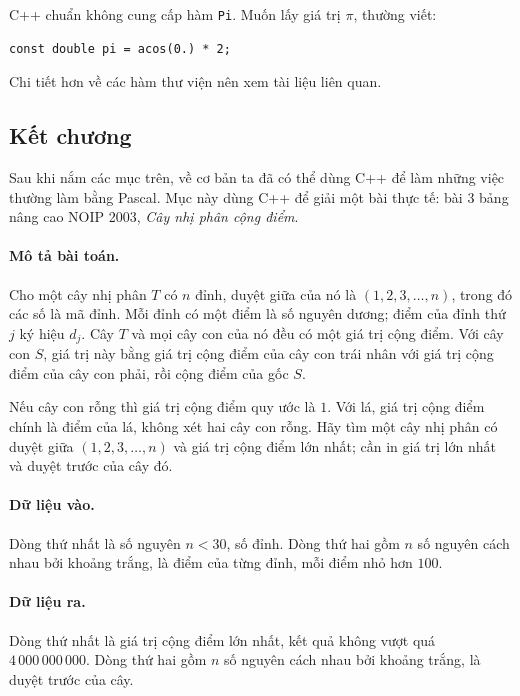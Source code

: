 \documentclass[11pt]{article}
\newcommand{\cpp}{C++}
\newcommand{\pascal}{Pascal}
\begin{document}
\cpp{} chuẩn không cung cấp hàm \verb|Pi|. Muốn lấy giá trị \(\pi\), thường
viết:

\begin{verbatim}
const double pi = acos(0.) * 2;
\end{verbatim}

Chi tiết hơn về các hàm thư viện nên xem tài liệu liên quan.

\subsection{Kết chương}

Sau khi nắm các mục trên, về cơ bản ta đã có thể dùng \cpp{} để làm những
việc thường làm bằng \pascal{}. Mục này dùng \cpp{} để giải một bài thực tế:
bài 3 bảng nâng cao NOIP 2003, \emph{Cây nhị phân cộng điểm}.

\paragraph{Mô tả bài toán.}
Cho một cây nhị phân \(T\) có \(n\) đỉnh, duyệt giữa của nó là
\((1,2,3,\ldots,n)\), trong đó các số là mã đỉnh. Mỗi đỉnh có một điểm là số
nguyên dương; điểm của đỉnh thứ \(j\) ký hiệu \(d_j\). Cây \(T\) và mọi cây
con của nó đều có một giá trị cộng điểm. Với cây con \(S\), giá trị này bằng
giá trị cộng điểm của cây con trái nhân với giá trị cộng điểm của cây con
phải, rồi cộng điểm của gốc \(S\).

Nếu cây con rỗng thì giá trị cộng điểm quy ước là \(1\). Với lá, giá trị cộng
điểm chính là điểm của lá, không xét hai cây con rỗng. Hãy tìm một cây nhị
phân có duyệt giữa \((1,2,3,\ldots,n)\) và giá trị cộng điểm lớn nhất; cần in
giá trị lớn nhất và duyệt trước của cây đó.

\paragraph{Dữ liệu vào.}
Dòng thứ nhất là số nguyên \(n<30\), số đỉnh. Dòng thứ hai gồm \(n\) số nguyên
cách nhau bởi khoảng trắng, là điểm của từng đỉnh, mỗi điểm nhỏ hơn \(100\).

\paragraph{Dữ liệu ra.}
Dòng thứ nhất là giá trị cộng điểm lớn nhất, kết quả không vượt quá
\(4\,000\,000\,000\). Dòng thứ hai gồm \(n\) số nguyên cách nhau bởi khoảng
trắng, là duyệt trước của cây.
\end{document}
